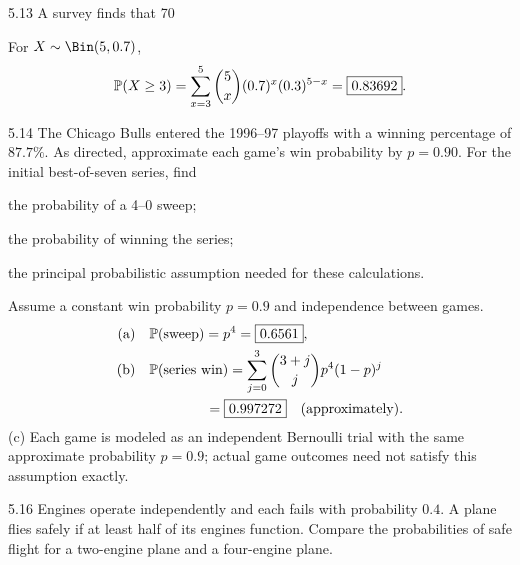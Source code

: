 \documentclass[11pt,oneside]{article}
\begin{document}
\begin{exercise}{5.13}
A survey finds that 70%
\end{exercise}

\begin{solution}
For $X\sim\Bin(5,0.7)$,
\[
\mathbb{P}(X\ge3)=\sum_{x=3}^{5}\binom{5}{x}(0.7)^x(0.3)^{5-x}=\boxed{0.83692}.
\]
\end{solution}

\begin{exercise}{5.14}
The Chicago Bulls entered the 1996--97 playoffs with a winning percentage of $87.7\%$. As directed, approximate each game's win probability by $p=0.90$. For the initial best-of-seven series, find
\par
\begin{exercisesubparts}
\item the probability of a 4--0 sweep;
\item the probability of winning the series;
\item the principal probabilistic assumption needed for these calculations.
\end{exercisesubparts}
\end{exercise}

\begin{solution}
Assume a constant win probability $p=0.9$ and independence between games.
\begin{align*}
\textup{(a)}\quad&\mathbb{P}(\text{sweep})=p^4=\boxed{0.6561},\\
\textup{(b)}\quad&\mathbb{P}(\text{series win})
=\sum_{j=0}^3\binom{3+j}{j}p^4(1-p)^j\\
&\hspace{4em}=\boxed{0.997272}\quad\text{(approximately)}.
\end{align*}
\noindent\textup{(c)} Each game is modeled as an independent Bernoulli trial with the same approximate probability $p=0.9$; actual game outcomes need not satisfy this assumption exactly.
\end{solution}

\begin{exercise}{5.16}
Engines operate independently and each fails with probability $0.4$. A plane flies safely if at least half of its engines function. Compare the probabilities of safe flight for a two-engine plane and a four-engine plane.
\end{exercise}
\end{document}
